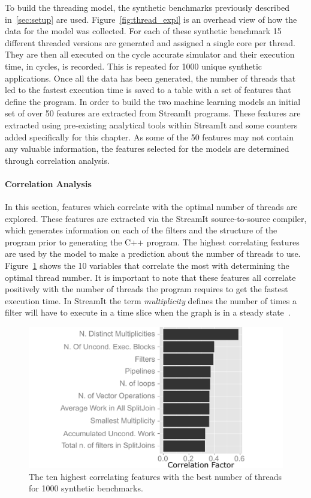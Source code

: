 To build the threading model, the synthetic benchmarks previously described in~\ref{sec:setup} are used.
Figure~\ref{fig:thread_expl} is an overhead view of how the data for the model was collected.
For each of these synthetic benchmark 15 different threaded versions are generated and assigned a single core per thread.
They are then all executed on the cycle accurate simulator and their execution time, in cycles, is recorded.
This is repeated for 1000 unique synthetic applications. 
Once all the data has been generated, the number of threads that led to the fastest execution time is saved to a table with a set of features that define the program.
In order to build the two machine learning models an initial set of over 50 features are extracted from StreamIt programs.
These features are extracted using pre-existing analytical tools within StreamIt and some counters added specifically for this chapter.
As some of the 50 features may not contain any valuable information, the features selected for the models are determined through correlation analysis.

\paragraph{Correlation Analysis}
In this section, features which correlate with the optimal number of threads are explored.
These features are extracted via the StreamIt source-to-source compiler, which generates information on each of the filters and the structure of the program prior to generating the C++ program.
The highest correlating features are used by the model to make a prediction about the number of threads to use.
Figure~\ref{fig:corr} shows the 10 variables that correlate the most with determining the optimal thread number.
It is important to note that these features all correlate positively with the number of threads the program requires to get the fastest execution time.
In StreamIt the term \textit{multiplicity} defines the number of times a filter will have to execute in a time slice when the graph is in a steady state~\cite{gordon2002streamcomp}.

\begin{figure} 
  \centering
 \includegraphics[width=1\textwidth]{streamit-paper/graphics/corrThreadRemix.pdf}
  \caption{The ten highest correlating features with the best number of threads for 1000 synthetic benchmarks.}\label{fig:corr}
\end{figure}
 
